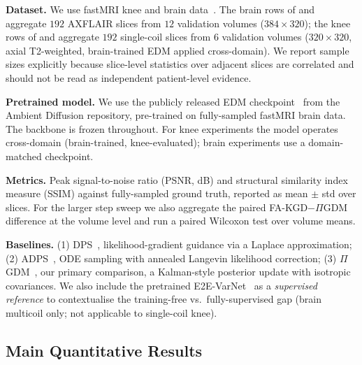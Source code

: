 \documentclass[10pt,twocolumn,letterpaper]{article}
\begin{document}
\textbf{Dataset.} We use fastMRI knee and brain data~\cite{zbontar2018fastmri}.
The brain rows of  and  aggregate $192$
AXFLAIR slices from $12$ validation volumes ($384\times320$); the knee rows
of  and  aggregate $192$
single-coil slices from $6$ validation volumes ($320\times320$, axial
T2-weighted, brain-trained EDM applied cross-domain). We report sample sizes
explicitly because slice-level statistics over adjacent slices are correlated
and should not be read as independent patient-level evidence.

\textbf{Pretrained model.} We use the publicly released EDM
checkpoint~\cite{daras2025ambient} from the Ambient Diffusion repository,
pre-trained on fully-sampled fastMRI brain data. The backbone is frozen
throughout. For knee experiments the model operates cross-domain
(brain-trained, knee-evaluated); brain experiments use a domain-matched
checkpoint.

\textbf{Metrics.} Peak signal-to-noise ratio (PSNR, dB) and structural
similarity index measure (SSIM) against fully-sampled ground truth,
reported as mean $\pm$ std over slices. For the larger step sweep we also
aggregate the paired FA-KGD$-\Pi$GDM difference at the volume level and run a
paired Wilcoxon test over volume means.

\textbf{Baselines.} (1) DPS~\cite{chung2023dps}, likelihood-gradient
guidance via a Laplace approximation; (2) ADPS~\cite{daras2025ambient},
ODE sampling with annealed Langevin likelihood correction;
(3) $\Pi$GDM~\cite{song2023pigdm}, our primary comparison, a Kalman-style
posterior update with isotropic covariances. We also include the pretrained
E2E-VarNet~\cite{sriram2020varnet} as a \emph{supervised reference} to
contextualise the training-free vs.\ fully-supervised gap (brain multicoil
only; not applicable to single-coil knee).
\subsection{Main Quantitative Results}
\end{document}
